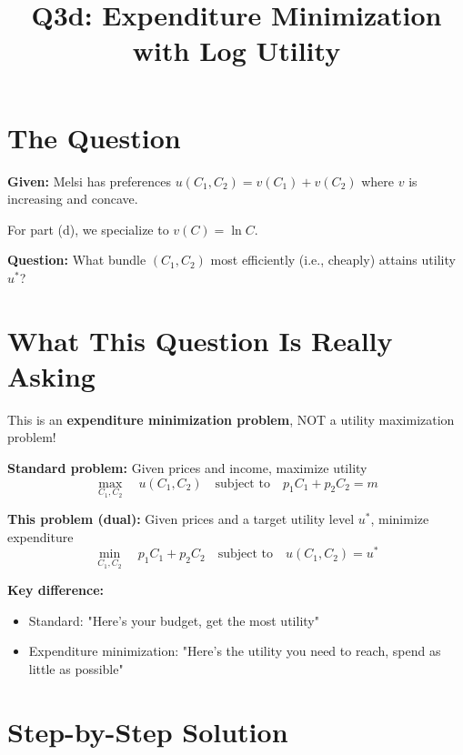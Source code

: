 \documentclass[12pt]{article}
\title{\textbf{Q3d: Expenditure Minimization with Log Utility}}
\author{}
\date{}
\begin{document}
\maketitle

\section*{The Question}

\textbf{Given:} Melsi has preferences $u(C_1, C_2) = v(C_1) + v(C_2)$ where $v$ is increasing and concave.

For part (d), we specialize to $v(C) = \ln C$.

\vspace{0.3cm}

\textbf{Question:} What bundle $(C_1, C_2)$ most efficiently (i.e., cheaply) attains utility $u^*$?

\section*{What This Question Is Really Asking}

\begin{tcolorbox}[colback=blue!5!white,colframe=blue!75!black]
This is an \textbf{expenditure minimization problem}, NOT a utility maximization problem!

\vspace{0.3cm}

\textbf{Standard problem:} Given prices and income, maximize utility
\[\max_{C_1, C_2} \quad u(C_1, C_2) \quad \text{subject to} \quad p_1 C_1 + p_2 C_2 = m\]

\vspace{0.3cm}

\textbf{This problem (dual):} Given prices and a target utility level $u^*$, minimize expenditure
\[\min_{C_1, C_2} \quad p_1 C_1 + p_2 C_2 \quad \text{subject to} \quad u(C_1, C_2) = u^*\]
\end{tcolorbox}

\textbf{Key difference:}
\begin{itemize}
\item Standard: "Here's your budget, get the most utility"
\item Expenditure minimization: "Here's the utility you need to reach, spend as little as possible"
\end{itemize}

\newpage

\section*{Step-by-Step Solution}
\end{document}
